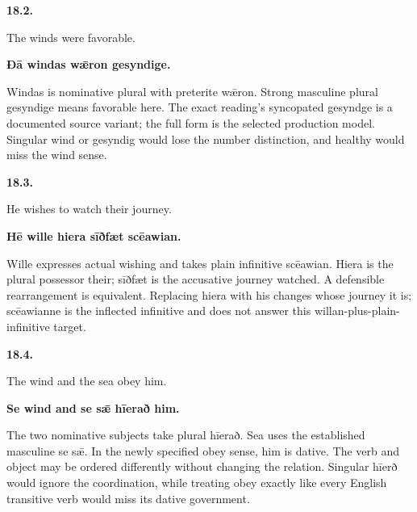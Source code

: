 \par\begin{minipage}{\linewidth}\raggedright
\textbf{18.2.}

The winds were favorable.

\textbf{Ðā windas wǣron gesyndige.}

Windas is nominative plural with preterite wǣron. Strong masculine plural gesyndige means favorable here. The exact reading's syncopated gesyndge is a documented source variant; the full form is the selected production model. Singular wind or gesyndig would lose the number distinction, and healthy would miss the wind sense.

\end{minipage}\par\addvspace{4pt}

\par\begin{minipage}{\linewidth}\raggedright
\textbf{18.3.}

He wishes to watch their journey.

\textbf{Hē wille hiera sīðfæt scēawian.}

Wille expresses actual wishing and takes plain infinitive scēawian. Hiera is the plural possessor their; sīðfæt is the accusative journey watched. A defensible rearrangement is equivalent. Replacing hiera with his changes whose journey it is; scēawianne is the inflected infinitive and does not answer this willan-plus-plain-infinitive target.

\end{minipage}\par\addvspace{4pt}

\par\begin{minipage}{\linewidth}\raggedright
\textbf{18.4.}

The wind and the sea obey him.

\textbf{Se wind and se sǣ hīerað him.}

The two nominative subjects take plural hīerað. Sea uses the established masculine se sǣ. In the newly specified obey sense, him is dative. The verb and object may be ordered differently without changing the relation. Singular hīerð would ignore the coordination, while treating obey exactly like every English transitive verb would miss its dative government.

\end{minipage}\par\addvspace{4pt}

